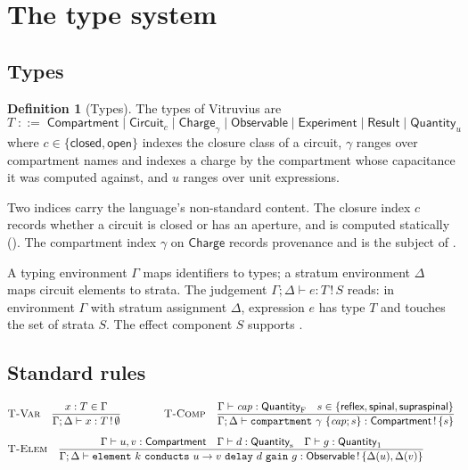 \documentclass[11pt,twocolumn,a4paper]{article}
\theoremstyle{thmstyle}
\theoremstyle{definition}
\newtheorem{definition}[theorem]{Definition}
\theoremstyle{remark}
\newcommand{\Env}{\Gamma}
\newcommand{\Circ}{\textsf{Circuit}}
\newcommand{\Comp}{\textsf{Compartment}}
\newcommand{\Chg}{\textsf{Charge}}
\newcommand{\Obs}{\textsf{Observable}}
\newcommand{\Exp}{\textsf{Experiment}}
\newcommand{\Res}{\textsf{Result}}
\begin{document}
\section{The type system}
\label{sec:typing}

\subsection{Types}

\begin{definition}[Types]
\label{def:types}
The types of Vitruvius are
\[
T \;::=\; \Comp \mid \Circ_{c} \mid \Chg_{\gamma} \mid \Obs
\mid \Exp \mid \Res \mid \textsf{Quantity}_{u}
\]
where $c\in\{\textsf{closed},\textsf{open}\}$ indexes the closure class of a
circuit, $\gamma$ ranges over compartment names and indexes a charge by the
compartment whose capacitance it was computed against, and $u$ ranges over
unit expressions.
\end{definition}

Two indices carry the language's non-standard content. The closure index $c$
records whether a circuit is closed or has an aperture, and is computed
statically (). The compartment index $\gamma$ on
$\Chg{}$ records provenance and is the subject of .

A typing environment $\Env$ maps identifiers to types; a stratum environment
$\Delta$ maps circuit elements to strata. The judgement
$\Env;\Delta\vdash e:T\,!\,S$ reads: in environment $\Env$ with stratum
assignment $\Delta$, expression $e$ has type $T$ and touches the set of strata
$S$. The effect component $S$ supports .

\subsection{Standard rules}

\begin{align*}
&\textsc{T-Var}\quad
\frac{x:T\in\Env}{\Env;\Delta\vdash x:T\,!\,\emptyset}
\qquad\qquad
\textsc{T-Comp}\quad
\frac{\Env\vdash \mathit{cap}:\textsf{Quantity}_{\mathrm{F}}\quad
      s\in\{\textsf{reflex},\textsf{spinal},\textsf{supraspinal}\}}
     {\Env;\Delta\vdash \texttt{compartment}\ \gamma\ \{\mathit{cap};s\}:\Comp\,!\,\{s\}}
\\[6pt]
&\textsc{T-Elem}\quad
\frac{\Env\vdash u,v:\Comp\quad
      \Env\vdash d:\textsf{Quantity}_{\mathrm{s}}\quad
      \Env\vdash g:\textsf{Quantity}_{1}}
     {\Env;\Delta\vdash \texttt{element}\ k\ \texttt{conducts}\ u\to v\
      \texttt{delay}\ d\ \texttt{gain}\ g:\Obs\,!\,\{\Delta(u),\Delta(v)\}}
\end{align*}
\end{document}

